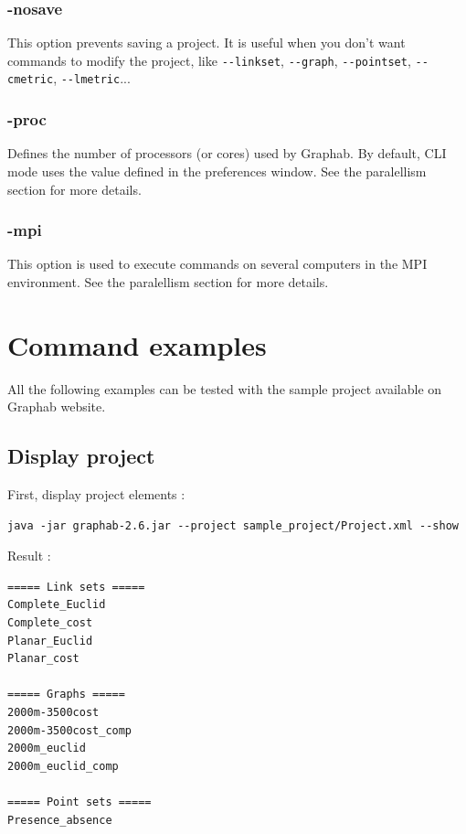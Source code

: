 \documentclass[a4paper,10pt]{report}
\begin{document}
\subsection{-nosave}
This option prevents saving a project. It is useful when you don't want commands to modify the project, 
like \verb|--linkset|, \verb|--graph|, \verb|--pointset|, \verb|--cmetric|, \verb|--lmetric|...

\subsection{-proc}
Defines the number of processors (or cores) used by Graphab.
By default, CLI mode uses the value defined in the preferences window.
See the paralellism section for more details.

\subsection{-mpi}
This option is used to execute commands on several computers in the MPI environment.
See the paralellism section for more details.

\chapter{Command examples}
All the following examples can be tested with the sample project available on Graphab website. 

\section{Display project}
First, display project elements :
\begin{Verbatim}
java -jar graphab-2.6.jar --project sample_project/Project.xml --show
\end{Verbatim}
Result :
\begin{Verbatim}
===== Link sets =====
Complete_Euclid
Complete_cost
Planar_Euclid
Planar_cost

===== Graphs =====
2000m-3500cost
2000m-3500cost_comp
2000m_euclid
2000m_euclid_comp

===== Point sets =====
Presence_absence
\end{Verbatim}
\end{document}
